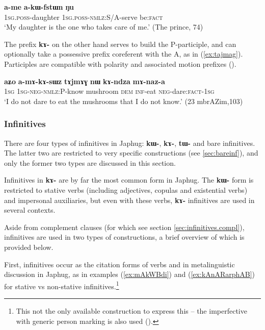 \documentclass[oneside,a4paper,11pt]{article}
\newcommand{\ipa}[1]{\textbf{\phon#1}} %
\begin{document}
\begin{exe}
\ex \label{ex:akWfstWn}
\gll \ipa{a-me} 	\ipa{a-kɯ-fstɯn} 	\ipa{ŋu} \\
\textsc{1sg.poss}-daughter \textsc{1sg.poss}-\textsc{nmlz}:S/A-serve be:\textsc{fact} \\
\glt `My daughter is the one who takes care of me.' (The prince, 74)
\end{exe}

The prefix \ipa{kɤ-} on the other hand serves to build the P-participle, and can optionally take a possessive prefix coreferent with the A, as in (\ref{ex:tajmag}). Participles are compatible with polarity and associated motion prefixes (\citealt{jacques16relatives}).

\begin{exe}
   \ex \label{ex:tajmag}
   \gll
\ipa{aʑo}  	\ipa{a-mɤ-kɤ-sɯz}   	\ipa{tɤjmɤɣ}  	\ipa{nɯ}  	\ipa{kɤ-ndza}  	\ipa{mɤ-naz-a}  \\
\textsc{1sg} \textsc{1sg-neg-nmlz:P}-know mushroom \textsc{dem} \textsc{inf}-eat \textsc{neg}-dare:\textsc{fact}-\textsc{1sg} \\
\glt `I do not dare to eat the mushrooms that I do not know.' (23 mbrAZim,103)
\end{exe}

\subsubsection{Infinitives} \label{sec:infinitives}
There are four types of infinitives in Japhug: \ipa{kɯ-}, \ipa{kɤ-}, \ipa{tɯ-} and bare infinitives. The latter two are restricted to very specific constructions (see \ref{sec:bareinf}), and only the former two types are discussed in this section. 

Infinitives in \ipa{kɤ-} are by far the most common form in Japhug. The \ipa{kɯ-} form is restricted to stative verbs (including adjectives, copulas and existential verbs) and impersonal auxiliaries, but even with these verbs, \ipa{kɤ-} infinitives are used in several contexts. 

Aside from complement clauses (for which see section \ref{sec:infinitives.compl}), infinitives are used in two types of constructions, a brief overview of which is provided below.

First, infinitives occur as the citation forms of verbs and in metalinguistic discussion in Japhug, as in examples (\ref{ex:mAkWBdi}) and (\ref{ex:kAnARarphAB}) for stative vs non-stative infinitives.\footnote{This not the only available construction to express this -- the imperfective with generic person marking is also used (\citealt{jacques15generic}).}
\end{document}
